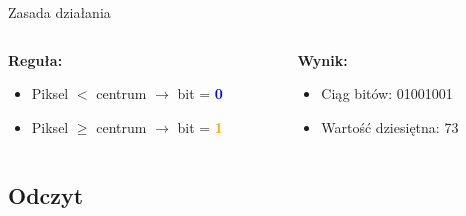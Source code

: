 \documentclass[9pt]{beamer}
\begin{document}
\begin{frame}{Zasada działania}
\begin{columns}
\begin{column}{0.5\textwidth}
\textbf{Reguła:}
\begin{itemize}
\item Piksel $<$ centrum $\rightarrow$ bit = \textcolor{blue}{\textbf{0}}
\item Piksel $\geq$ centrum $\rightarrow$ bit = \textcolor{orange}{\textbf{1}}
\end{itemize}
\end{column}
\begin{column}{0.5\textwidth}
\textbf{Wynik:}
\begin{itemize}
\item Ciąg bitów: 01001001
\item Wartość dziesiętna: 73
\end{itemize}
\end{column}
\end{columns}

\end{frame}

\subsection{Odczyt}
\end{document}

